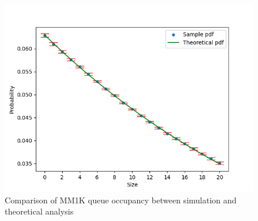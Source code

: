\begin{figure}[htbp]
    \centering
    \includegraphics[width=\textwidth]{images/MM1k_analysis.png}
    \caption{Comparison of MM1K queue occupancy between simulation and theoretical analysis}
    \label{fig:MM1K_analysis}
\end{figure}


